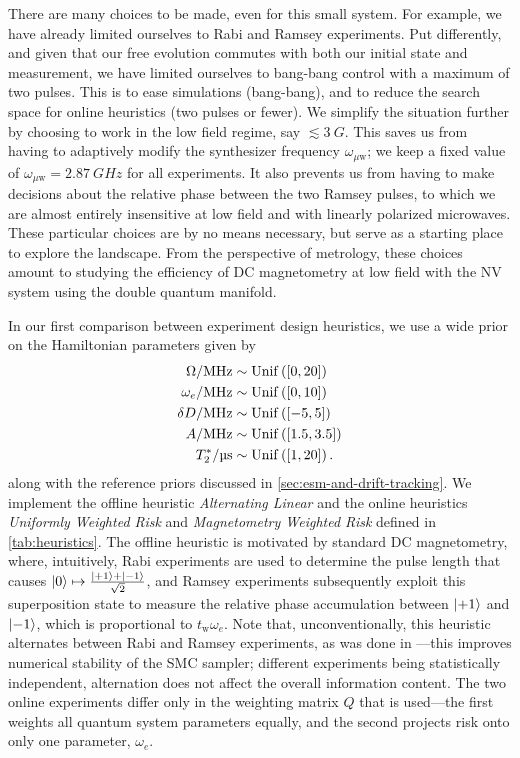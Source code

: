 \documentclass[aps,nofootinbib,twocolumn,superscriptaddress]{revtex4}
\newcommand{\tw}{t_\text{w}}
\newcommand{\uw}{{\mu\text{w}}}
\begin{document}
There are many choices to be made, even for this small system.
For example, we have already limited ourselves to Rabi and
Ramsey experiments.
Put differently, and given that our free evolution commutes with
both our initial state and measurement,
we have limited ourselves to bang-bang control
with a maximum of two pulses.
This is to ease simulations (bang-bang), and to reduce the
search space for online heuristics (two pulses or fewer).
We simplify the situation further by choosing to work in the low field
regime, say $\lesssim\SI{3}{G}$.
This saves us from having to adaptively modify the synthesizer
frequency $\omega_\uw$; we keep a fixed value of
$\omega_\uw=\SI{2.87}{GHz}$ for all experiments.
It also
prevents us from having to make decisions about the relative
phase between the two Ramsey pulses, to which we are
almost entirely insensitive at low field and with linearly
polarized microwaves.
These particular choices are by no means necessary, but serve
as a starting place to explore the landscape.
From the perspective of metrology, these choices amount to studying
the efficiency of DC magnetometry at low field with the NV system using
the double quantum manifold.

In our first comparison between experiment design heuristics,
we use a wide prior on the Hamiltonian
parameters given by
\begin{subequations}
\begin{align}
    \Omega/\si{MHz}
        &\sim \uniformdist\left( [0, 20] \right) \\
    \omega_e/\si{MHz}
        &\sim \uniformdist\left( [0, 10] \right) \\
    \delta D/\si{MHz}
        &\sim \uniformdist\left( [-5, 5] \right) \\
    A/\si{MHz}
        &\sim \uniformdist\left( [1.5, 3.5] \right) \\
    T_2^*/\si{\micro\second}
        &\sim \uniformdist\left( [1, 20] \right).
\end{align}
\label{eq:wide-prior}%
\end{subequations}
along with the reference priors discussed in
\autoref{sec:esm-and-drift-tracking}.
We implement the offline heuristic \textit{Alternating Linear} and the
online heuristics \textit{Uniformly Weighted Risk} and
\textit{Magnetometry Weighted Risk}
defined in \autoref{tab:heuristics}.
The offline heuristic is motivated by standard DC magnetometry,
where, intuitively, Rabi experiments are used to determine the pulse length
that causes $\ket{0}\mapsto\frac{\ket{+1}+\ket{-1}}{\sqrt{2}}$,
and Ramsey experiments subsequently exploit  this superposition state
to measure the relative
phase accumulation between $\ket{+1}$ and $\ket{-1}$, which is
proportional to $\tw \omega_e$.
Note that, unconventionally, this heuristic alternates between
Rabi and Ramsey experiments, as was done in \cite{hincks_statistical_2018}---this improves
numerical stability of the SMC sampler; different
experiments being statistically independent, alternation
does not affect the overall information content.
The two online experiments differ only in the weighting matrix $Q$ that is used---the
first weights all quantum system parameters equally, and the second projects risk
onto only one parameter, $\omega_e$.
\end{document}
